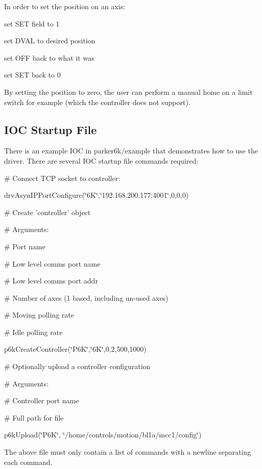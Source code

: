 In order to set the position on an axis: 
\begin{DoxyEnumerate}
\item set SET field to 1 
\item set DVAL to desired position 
\item set OFF back to what it was 
\item set SET back to 0 
\end{DoxyEnumerate}

By setting the position to zero, the user can perform a manual home on a limit switch for example (which the controller does not support).\hypertarget{index_startup}{}\subsection{IOC Startup File}\label{index_startup}
There is an example IOC in parker6k/example that demonstrates how to use the driver. There are several IOC startup file commands required:

{\ttfamily  \# Connect TCP socket to controller:\par
 drvAsynIPPortConfigure(\char`\"{}6K\char`\"{},\char`\"{}192.168.200.177:4001\char`\"{},0,0,0)\par
}

{\ttfamily \# Create 'controller' object\par
 \# Arguments:\par
 \# Port name\par
 \# Low level comms port name\par
 \# Low level comms port addr\par
 \# Number of axes (1 based, including un-\/used axes)\par
 \# Moving polling rate\par
 \# Idle polling rate\par
 p6kCreateController(\char`\"{}P6K\char`\"{},\char`\"{}6K\char`\"{},0,2,500,1000)\par
}

{\ttfamily \# Optionally upload a controller configuration\par
 \# Arguments:\par
 \# Controller port name\par
 \# Full path for file\par
 p6kUpload(\char`\"{}P6K\char`\"{}, \char`\"{}/home/controls/motion/bl1a/mcc1/config\char`\"{})\par
 }

The above file must only contain a list of commands with a newline separating each command.

